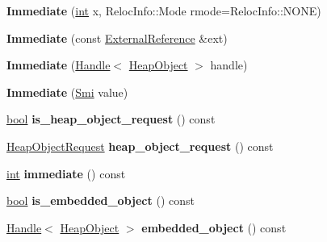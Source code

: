 \begin{DoxyCompactItemize}
{\bfseries Immediate} (\mbox{\hyperlink{classint}{int}} x, Reloc\+Info\+::\+Mode rmode=Reloc\+Info\+::\+N\+O\+NE)
\item 
\mbox{\label{classv8_1_1internal_1_1Immediate_a7ecdd1a029e82b282bdd582a67e10a72}} 
{\bfseries Immediate} (const \mbox{\hyperlink{classv8_1_1internal_1_1ExternalReference}{External\+Reference}} \&ext)
\item 
\mbox{\label{classv8_1_1internal_1_1Immediate_a38e0d823dfd0322df19fa3b0f62e64cf}} 
{\bfseries Immediate} (\mbox{\hyperlink{classv8_1_1internal_1_1Handle}{Handle}}$<$ \mbox{\hyperlink{classv8_1_1internal_1_1HeapObject}{Heap\+Object}} $>$ handle)
\item 
\mbox{\label{classv8_1_1internal_1_1Immediate_afd2b8993f0dcc7b31cedbe8401af4383}} 
{\bfseries Immediate} (\mbox{\hyperlink{classv8_1_1internal_1_1Smi}{Smi}} value)
\item 
\mbox{\label{classv8_1_1internal_1_1Immediate_a2aeb3d1c922fbce2c55d023bb94d1450}} 
\mbox{\hyperlink{classbool}{bool}} {\bfseries is\+\_\+heap\+\_\+object\+\_\+request} () const
\item 
\mbox{\label{classv8_1_1internal_1_1Immediate_a6bde7a4d171e96fa9f6b19eccde80bd8}} 
\mbox{\hyperlink{classv8_1_1internal_1_1HeapObjectRequest}{Heap\+Object\+Request}} {\bfseries heap\+\_\+object\+\_\+request} () const
\item 
\mbox{\label{classv8_1_1internal_1_1Immediate_adb04b814f4b09b7231cda1b30f0356a4}} 
\mbox{\hyperlink{classint}{int}} {\bfseries immediate} () const
\item 
\mbox{\label{classv8_1_1internal_1_1Immediate_a7f46ff515c1cb738016e6766b4bc69f6}} 
\mbox{\hyperlink{classbool}{bool}} {\bfseries is\+\_\+embedded\+\_\+object} () const
\item 
\mbox{\label{classv8_1_1internal_1_1Immediate_a4ad381d20e534aa202fbcf8832ece8f8}} 
\mbox{\hyperlink{classv8_1_1internal_1_1Handle}{Handle}}$<$ \mbox{\hyperlink{classv8_1_1internal_1_1HeapObject}{Heap\+Object}} $>$ {\bfseries embedded\+\_\+object} () const

\end{DoxyCompactItemize}
